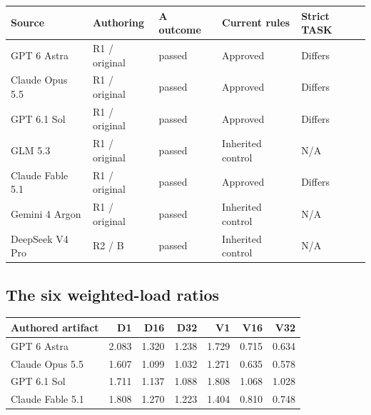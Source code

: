 \documentclass[11pt,letterpaper]{article}
\begin{document}
\small\begin{tabularx}{\linewidth}{@{}Xllll@{}}\toprule\textbf{Source} & \textbf{Authoring} & \textbf{A outcome} & \textbf{Current rules} & \textbf{Strict TASK}\\\midrule

GPT 6 Astra & R1 / original & passed & Approved & Differs\\

Claude Opus 5.5 & R1 / original & passed & Approved & Differs\\

GPT 6.1 Sol & R1 / original & passed & Approved & Differs\\

GLM 5.3 & R1 / original & passed & Inherited control & N/A\\

Claude Fable 5.1 & R1 / original & passed & Approved & Differs\\

Gemini 4 Argon & R1 / original & passed & Inherited control & N/A\\

DeepSeek V4 Pro & R2 / B & passed & Inherited control & N/A\\

\bottomrule\end{tabularx}\normalsize

\subsection{The six weighted-load ratios}

\small\begin{tabularx}{\linewidth}{@{}Xrrrrrr@{}}\toprule\textbf{Authored artifact} & D1 & D16 & D32 & V1 & V16 & V32\\\midrule

GPT 6 Astra & 2.083 & 1.320 & 1.238 & 1.729 & 0.715 & 0.634\\

Claude Opus 5.5 & 1.607 & 1.099 & 1.032 & 1.271 & 0.635 & 0.578\\

GPT 6.1 Sol & 1.711 & 1.137 & 1.088 & 1.808 & 1.068 & 1.028\\

Claude Fable 5.1 & 1.808 & 1.270 & 1.223 & 1.404 & 0.810 & 0.748\\

\bottomrule\end{tabularx}\normalsize
\end{document}

